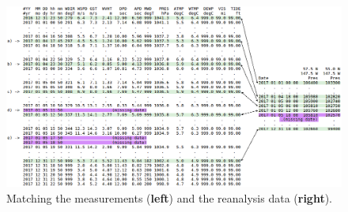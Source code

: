 \documentclass[energies,article,accept,moreauthors,pdftex]{Definitions/mdpi}
\begin{document}
\nointerlineskip
\begin{figure}[H]
			\widefigure
			\includegraphics[scale=0.45]{figures/FigureMatchingMeasurements.png}
			\caption{Matching the measurements (\textbf{left}) and the reanalysis data (\textbf{right}).}
			\label{fig:matchingMeasurements}
		\end{figure}
\begin{paracol}{2}
\switchcolumn

		
\end{paracol}


\end{document}
